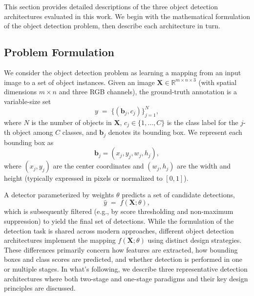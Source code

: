 \documentclass[conference]{IEEEtran}
\begin{document}
This section provides detailed descriptions of the three object detection architectures evaluated in this work. We begin with the mathematical formulation of the object detection problem, then describe each architecture in turn.

\subsection{Problem Formulation}

We consider the object detection problem as learning a mapping from an input image to a set of object instances. Given an image $\mathbf{X} \in \mathbb{R}^{m \times n \times 3}$ (with spatial dimensions $m \times n$ and three RGB channels), the ground-truth annotation is a variable-size set
\begin{equation}
y \;=\; \{(\mathbf{b}_j, c_j)\}_{j=1}^{N},
\end{equation}
where $N$ is the number of objects in $\mathbf{X}$, $c_j \in \{1,\ldots,C\}$ is the class label for the $j$-th object among $C$ classes, and $\mathbf{b}_j$ denotes its bounding box. We represent each bounding box as
\begin{equation}
\mathbf{b}_j = (x_j, y_j, w_j, h_j),
\end{equation}
where $(x_j, y_j)$ are the center coordinates and $(w_j, h_j)$ are the width and height (typically expressed in pixels or normalized to $[0,1]$).

A detector parameterized by weights $\theta$ predicts a set of candidate detections,
\begin{equation}
\hat{y} \;=\; f(\mathbf{X};\theta),
\end{equation}
which is subsequently filtered (e.g., by score thresholding and non-maximum suppression) to yield the final set of detections. While the formulation of the detection task is shared across modern approaches, different object detection architectures implement the mapping $f(\mathbf{X};\theta)$ using distinct design strategies. These differences primarily concern how features are extracted, how bounding boxes and class scores are predicted, and whether detection is performed in one or multiple stages. In what's following, we describe three representative detection architectures where both two-stage and one-stage paradigms and their key design principles are discussed.

\end{document}
